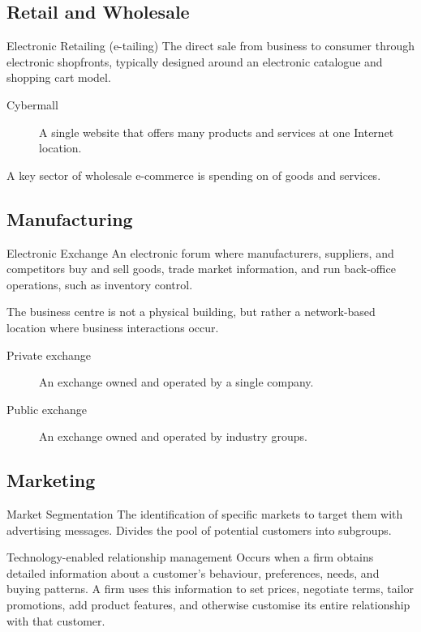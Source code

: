\documentclass[\main/notes.tex]{subfiles}
\begin{document}
			\subsection{Retail and Wholesale}
				\begin{definition}{Electronic Retailing (e-tailing)}
					The direct sale from business to consumer through electronic shopfronts, typically designed around an electronic catalogue and shopping cart model.

					\begin{description}
						\item[Cybermall] A single website that offers many products and services at one Internet location.
					\end{description}

					A key sector of wholesale e-commerce is spending on  of goods and services.
				\end{definition}
			\subsection{Manufacturing}
				\begin{definition}{Electronic Exchange}
						An electronic forum where manufacturers, suppliers, and competitors buy and sell goods, trade market information, and run back-office operations, such as inventory control.

						The business centre is not a physical building, but rather a network-based location where business interactions occur.
						\begin{description}
							\item[Private exchange] An exchange owned and operated by a single company.
							\item[Public exchange] An exchange owned and operated by industry groups.  
						\end{description}
				\end{definition}
			\subsection{Marketing}
				\begin{definition}{Market Segmentation}
					The identification of specific markets to target them with advertising messages. Divides the pool of potential customers into subgroups.
				\end{definition}
				\begin{definition}{Technology-enabled relationship management}
					Occurs when a firm obtains detailed information about a customer's behaviour, preferences, needs, and buying patterns. A firm uses this information to set prices, negotiate terms, tailor promotions, add product features, and otherwise customise its entire relationship with that customer.
				\end{definition}
\end{document}
